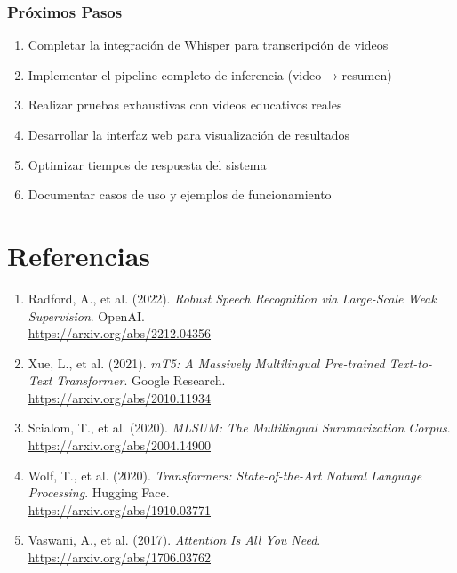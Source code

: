 \documentclass[12pt,a4paper]{article}
\begin{document}
\subsubsection{Próximos Pasos}

\begin{enumerate}
    \item Completar la integración de Whisper para transcripción de videos
    \item Implementar el pipeline completo de inferencia (video → resumen)
    \item Realizar pruebas exhaustivas con videos educativos reales
    \item Desarrollar la interfaz web para visualización de resultados
    \item Optimizar tiempos de respuesta del sistema
    \item Documentar casos de uso y ejemplos de funcionamiento
\end{enumerate}

\newpage


\section*{Referencias}

\begin{enumerate}[leftmargin=*]
    \item Radford, A., et al. (2022). \textit{Robust Speech Recognition via Large-Scale Weak Supervision}. OpenAI. \\
    \url{https://arxiv.org/abs/2212.04356}
    
    \item Xue, L., et al. (2021). \textit{mT5: A Massively Multilingual Pre-trained Text-to-Text Transformer}. Google Research. \\
    \url{https://arxiv.org/abs/2010.11934}
    
    \item Scialom, T., et al. (2020). \textit{MLSUM: The Multilingual Summarization Corpus}. \\
    \url{https://arxiv.org/abs/2004.14900}
    
    \item Wolf, T., et al. (2020). \textit{Transformers: State-of-the-Art Natural Language Processing}. Hugging Face. \\
    \url{https://arxiv.org/abs/1910.03771}
    
    \item Vaswani, A., et al. (2017). \textit{Attention Is All You Need}. \\
    \url{https://arxiv.org/abs/1706.03762}
\end{enumerate}

\end{document}
